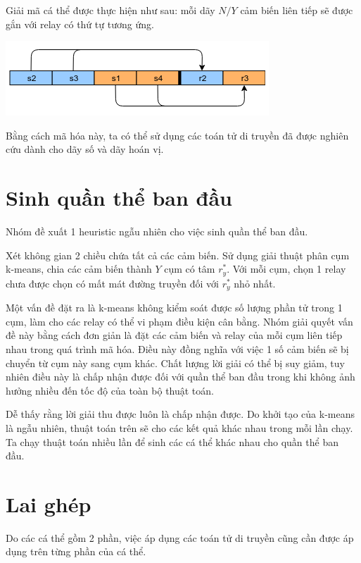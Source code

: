 \documentclass[hidelinks, 11pt, a4paper]{report}
\begin{document}
Giải mã cá thể được thực hiện như sau: mỗi dãy $N/Y$ cảm biến liên tiếp sẽ được gắn với relay có thứ tự tương ứng.

\begin{center}
    \includegraphics[scale=0.7]{WusnDecode.png}
\end{center}

Bằng cách mã hóa này, ta có thể sử dụng các toán tử di truyền đã được nghiên cứu dành cho dãy số và dãy hoán vị.

\section{Sinh quần thể ban đầu}
Nhóm đề xuất 1 heuristic ngẫu nhiên cho việc sinh quần thể ban đầu. 

Xét không gian 2 chiều chứa tất cả các cảm biến. Sử dụng giải thuật phân cụm k-means, chia các cảm biến thành $Y$ cụm có tâm $r^*_y$. Với mỗi cụm, chọn 1 relay chưa được chọn có mất mát đường truyền đối với $r^*_y$ nhỏ nhất.

Một vấn đề đặt ra là k-means không kiểm soát được số lượng phần tử trong 1 cụm, làm cho các relay có thể vi phạm điều kiện cân bằng. Nhóm giải quyết vấn đề này bằng cách đơn giản là đặt các cảm biến và relay của mỗi cụm liên tiếp nhau trong quá trình mã hóa. Điều này đồng nghĩa với việc 1 số cảm biến sẽ bị chuyển từ cụm này sang cụm khác. Chất lượng lời giải có thể bị suy giảm, tuy nhiên điều này là chấp nhận được đối với quần thể ban đầu trong khi không ảnh hưởng nhiều đến tốc độ của toàn bộ thuật toán.

Dễ thấy rằng lời giải thu được luôn là chấp nhận được. Do khởi tạo của k-means là ngẫu nhiên, thuật toán trên sẽ cho các kết quả khác nhau trong mỗi lần chạy. Ta chạy thuật toán nhiều lần để sinh các cá thể khác nhau cho quần thể ban đầu.

\section{Lai ghép}
Do các cá thể gồm 2 phần, việc áp dụng các toán tử di truyền cũng cần được áp dụng trên từng phần của cá thể.
\end{document}
